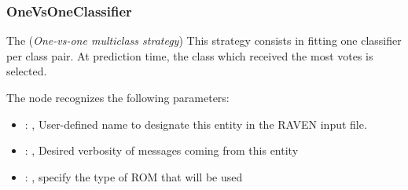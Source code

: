 \subsubsection{OneVsOneClassifier}
  The  (\textit{One-vs-one multiclass strategy})
  This strategy consists in fitting one classifier per class pair. At prediction time, the class
  which received the most votes is selected.

  The  node recognizes the following parameters:
    \begin{itemize}
      \item {}: ,
        User-defined name to designate this entity in the RAVEN input file.
      \item {}: ,
        Desired verbosity of messages coming from this entity
      \item {}: ,
        specify the type of ROM that will be used
  \end{itemize}

